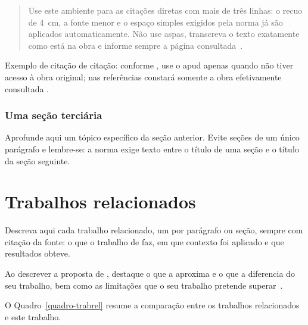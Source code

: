 \documentclass[tcc,capa]{texifsap}
\begin{document}
\begin{quote}
  Use este ambiente para as citações diretas com mais de três linhas: o
  recuo de 4~cm, a fonte menor e o espaço simples exigidos pela norma já
  são aplicados automaticamente. Não use aspas, transcreva o texto
  exatamente como está na obra e informe sempre a página
  consultada~\cite[p.~10]{Nobre:2017}.
\end{quote}

Exemplo de citação de citação: conforme ,
use o apud apenas quando não tiver acesso à obra original; nas
referências constará somente a obra efetivamente consultada
.

\subsection{Uma seção terciária}

Aprofunde aqui um tópico específico da seção anterior. Evite seções de
um único parágrafo e lembre-se: a norma exige texto entre o título de
uma seção e o título da seção seguinte.

\chapter{Trabalhos relacionados}


Descreva aqui cada trabalho relacionado, um por parágrafo ou seção,
sempre com citação da fonte: o que o trabalho de \citet{Moore:1979:MAI}
faz, em que contexto foi aplicado e que resultados obteve.

Ao descrever a proposta de \citet{Cormen}, destaque o que a aproxima e
o que a diferencia do seu trabalho, bem como as limitações que o seu
trabalho pretende superar~\cite{vonNeumann:1966:TSR}.

O Quadro~\ref{quadro-trabrel} resume a comparação entre os trabalhos
relacionados e este trabalho.
\end{document}
